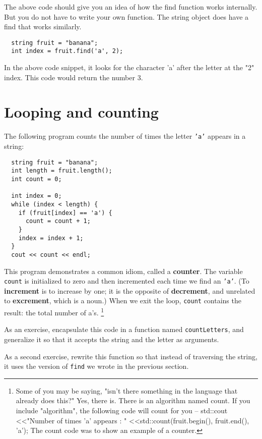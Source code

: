 The above code should give you an idea of how the find function works internally. But you do not have to write your own function. The string object does have a find that works similarly.

\begin{verbatim}
  string fruit = "banana";
  int index = fruit.find('a', 2);
\end{verbatim}
In the above code snippet, it looks for the character 'a' after the letter at the "2" index. This code would return the number 3.

\section{Looping and counting}
\label{loopcount}

The following program counts the
number of times the letter {\tt 'a'} appears in a string:

\begin{verbatim}
  string fruit = "banana";
  int length = fruit.length();
  int count = 0;

  int index = 0;
  while (index < length) {
    if (fruit[index] == 'a') {
      count = count + 1;
    }
    index = index + 1;
  }
  cout << count << endl;
\end{verbatim}
%
This program demonstrates a common idiom, called a {\bf counter}.  The
variable {\tt count} is initialized to zero and then incremented each
time we find an {\tt 'a'}.  (To {\bf increment} is to increase by one;
it is the opposite of {\bf decrement}, and unrelated to {\bf
excrement}, which is a noun.)  When we exit the loop, {\tt count}
contains the result: the total number of a's.
\footnote{Some of you may be saying, "isn't there something in the language that already does this?" Yes, there is. There is an algorithm named count. If you include "algorithm", the following code will count for you --   
std::cout \textless\textless "Number of times 'a' appears : "
         \textless\textless std::count(fruit.begin(), fruit.end(), 'a'); 
The count code was to show an example of a counter. 
}

As an exercise, encapsulate this code in a function named
{\tt countLetters}, and generalize it so that it accepts the
string and the letter as arguments.


As a second exercise, rewrite this function so that instead
of traversing the string, it uses the version of
{\tt find} we wrote in the previous section.


